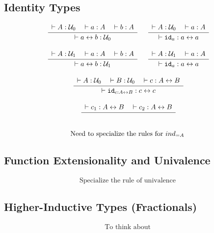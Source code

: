 \documentclass[format=acmlarge,review,natbib]{acmart}
\newcommand{\idc}{\mathtt{id}}
\newcommand{\iso}{\leftrightarrow}
\newcommand{\uzero}{\mathcal{U}_0}
\newcommand{\uone}{\mathcal{U}_1}
\newcommand{\Rule}[2]{
\makebox{
$\displaystyle
\frac{\begin{array}{l}#1\\\end{array}}
{\begin{array}{l}#2\\\end{array}}$}}
\newcommand{\proves}{\vdash}
\newcommand{\jdg}[3]{#1 \proves #2 : #3}
\begin{document}
\subsection{Identity Types}

\[\begin{array}{c}
\Rule{\jdg{}{A}{\uzero}
         \quad\jdg{}{a}{A}
         \quad\jdg{}{b}{A}}
        {\jdg{}{a \iso b}{\uzero}}
\quad
\Rule{\jdg{}{A}{\uzero}
          \quad\jdg{}{a}{A}}
         {\jdg{}{\idc_{a}}{a \iso a}}
\\
\\
\Rule{\jdg{}{A}{\uone}
         \quad\jdg{}{a}{A}
         \quad\jdg{}{b}{A}}
        {\jdg{}{a \iso b}{\uone}}
\quad
\Rule{\jdg{}{A}{\uone}
          \quad\jdg{}{a}{A}}
         {\jdg{}{\idc_{a}}{a \iso a}}
\\
\\
\Rule{\jdg{}{A}{\uzero}
         \quad\jdg{}{B}{\uzero}
         \quad\jdg{}{c}{A \iso B}}
         {\jdg{}{\idc_{c:A\iso B}}{c \iso c}}
\\
\\
\Rule{\jdg{}{c_1}{A \iso B}
         \quad\jdg{}{c_2}{A \iso B}}
         {}
\\
\\
\mbox{Need to specialize the rules for } ind_{=A}
\end{array}\]

\subsection{Function Extensionality and Univalence}

\[\begin{array}{c}
\mbox{Specialize the rule of univalence}
\end{array}\]

\subsection{Higher-Inductive Types (Fractionals)}

\[\begin{array}{c}
\mbox{To think about}
\end{array}\]


{\footnotesize

}
\end{document}
